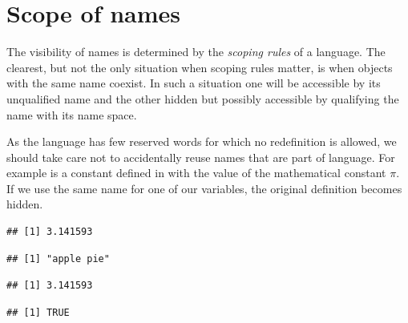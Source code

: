 \documentclass[krantz2]{krantz}\usepackage{knitr}
\begin{document}
\begin{explainbox}
%
\end{explainbox}

\section{Scope of names}

The visibility of names is determined by the \emph{scoping rules} of a language. The clearest, but not the only situation when scoping rules matter, is when objects with the same name coexist. In such a situation one will be accessible by its unqualified name and the other hidden but possibly accessible by qualifying the name with its name space.

As the \Rlang language has few reserved words for which no redefinition is allowed, we should take care not to accidentally reuse names that are part of language. For example  is a constant defined in \Rlang with the value of the mathematical constant $\pi$. If we use the same name for one of our variables, the original definition becomes hidden.

\begin{knitrout}\footnotesize
{}\color{fgcolor}\begin{kframe}
\begin{alltt}
\end{alltt}
\begin{verbatim}
## [1] 3.141593
\end{verbatim}
\begin{alltt}
 \hlkwb{<-} 
\end{alltt}
\begin{verbatim}
## [1] "apple pie"
\end{verbatim}
\begin{alltt}
\end{alltt}
\begin{verbatim}
## [1] 3.141593
\end{verbatim}
\begin{alltt}
\hlstd{(}\hlstd{)}
\end{alltt}
\begin{verbatim}
## [1] TRUE
\end{verbatim}
\end{kframe}
\end{knitrout}
\end{document}
